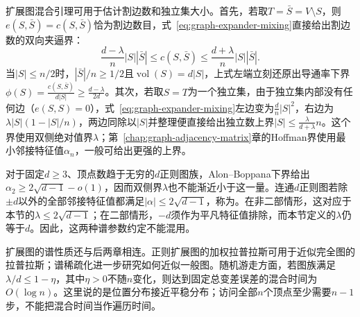 扩展图混合引理可用于估计割边数和独立集大小。首先，若取$T=\bar S=V\setminus S$，则$e(S,\bar S)=c(S,\bar S)$恰为割边数目，式~\eqref{eq:graph-expander-mixing}直接给出割边数的双向夹逼界：
\[
\frac{d-\lambda}{n}|S||\bar S|
\le c(S,\bar S)
\le \frac{d+\lambda}{n}|S||\bar S|.
\]
当$|S|\le n/2$时，$|\bar S|/n\ge 1/2$且$\operatorname{vol}(S)=d|S|$，上式左端立刻还原出导通率下界$\phi(S)=\frac{c(S,\bar S)}{d|S|}\ge\frac{d-\lambda}{2d}$。其次，若取$S=T$为一个独立集，由于独立集内部没有任何边（$e(S,S)=0$），式~\eqref{eq:graph-expander-mixing}左边变为$\frac{d}{n}|S|^2$，右边为$\lambda|S|(1-|S|/n)$，两边同除以$|S|$并整理便直接给出独立数上界$|S|\le\frac{\lambda}{d+\lambda}n$。这个界使用双侧绝对值界$\lambda$；第~\ref{chap:graph-adjacency-matrix}章的Hoffman界使用最小邻接特征值$\alpha_n$，一般可给出更强的上界。

对于固定$d\geq3$、顶点数趋于无穷的$d$正则图族，Alon--Boppana下界给出$\alpha_2\geq2\sqrt{d-1}-o(1)$，因而双侧界$\lambda$也不能渐近小于这一量。连通$d$正则图若除$\pm d$以外的全部邻接特征值都满足$|\alpha|\leq2\sqrt{d-1}$，称为。在非二部情形，这对应于本节的$\lambda\leq2\sqrt{d-1}$；在二部情形，$-d$须作为平凡特征值排除，而本节定义的$\lambda$仍等于$d$。因此，这两种谱参数约定不能混用。

扩展图的谱性质还与后两章相连。正则扩展图的加权拉普拉斯可用于近似完全图的拉普拉斯；谱稀疏化进一步研究如何近似一般图。随机游走方面，若图族满足$\lambda/d\leq1-\eta$，其中$\eta>0$不随$n$变化，则达到固定总变差误差的混合时间为$O(\log n)$。这里说的是位置分布接近平稳分布；访问全部$n$个顶点至少需要$n-1$步，不能把混合时间当作遍历时间。
